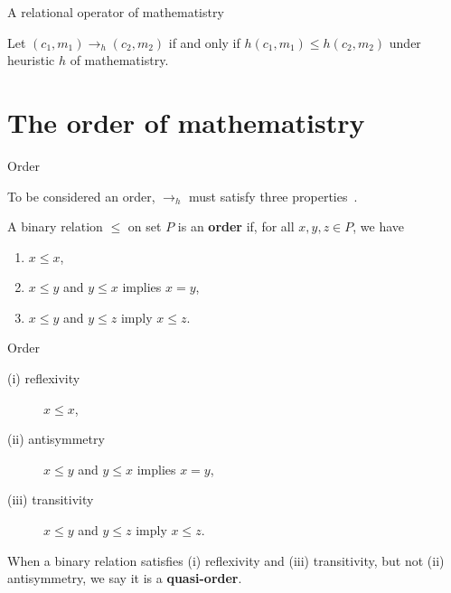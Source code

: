 \documentclass{beamer}
\begin{document}

\begin{frame}{A relational operator of mathematistry}

\begin{definition}\label{def:om}
Let $(c_1, m_1) \to_h (c_2, m_2)$ if and only if $h(c_1, m_1) \leqslant h(c_2, m_2)$ under heuristic $h$ of mathematistry.
\end{definition}



\end{frame}


\section{The order of mathematistry}


\begin{frame}{Order}

To be considered an order, $\to_h$ must satisfy three properties~\cite{davey_introduction_2002-1}.

\vspace{1.5cm}

\begin{defn}\label{def:order}
A binary relation $\leqslant$ on set $P$ is an \textbf{order} if, for all $x, y, z \in P$, we have
\begin{enumerate}[label=(\roman*)]
    \item $x \leqslant x$,
    \item $x \leqslant y$ and $y \leqslant x$ implies $x = y$,
    \item $x \leqslant y$ and $y \leqslant z$ imply $x \leqslant z$.
\end{enumerate}

\end{defn}

\end{frame}



\begin{frame}{Order}

\begin{description}%
    \item[(i) reflexivity] $x \leqslant x$,
    \item[(ii) antisymmetry] $x \leqslant y$ and $y \leqslant x$ implies $x = y$,
    \item[(iii) transitivity] $x \leqslant y$ and $y \leqslant z$ imply $x \leqslant z$.
\end{description}

\vspace{1.5cm}

When a binary relation satisfies (i) reflexivity and (iii) transitivity, but not (ii) antisymmetry, we say it is a \textbf{quasi-order}.


 \end{frame}
\end{document}
